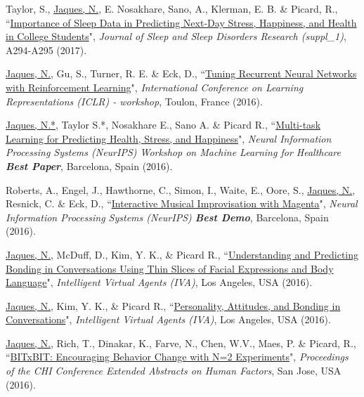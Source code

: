 \documentclass[paper=letter,fontsize=11pt]{scrartcl} %
\newcommand{\PaperEntry}[6]{
        \noindent #1, ``\href{#6}{#2}", \textit{#3}, #4 (#5).}
\begin{document}
\begin{etaremune}
\item \PaperEntry{Taylor, S., \underline{Jaques, N.}, E. Nosakhare, Sano, A., Klerman, E. B. \& Picard, R.}{Importance of Sleep Data in Predicting Next-Day Stress, Happiness, and Health in College Students}{Journal of Sleep and Sleep Disorders Research (suppl\_1)}{A294-A295}{2017}{https://affect.media.mit.edu/pdfs/17.Taylor-etal-MoodPrediction-SLEEP2017-Poster.pdf}

\item \PaperEntry{\underline{Jaques, N.}, Gu, S., Turner, R. E. \& Eck, D.}{Tuning Recurrent Neural Networks with Reinforcement Learning}{International Conference on Learning Representations (ICLR) - workshop}{Toulon, France}{2016}{https://openreview.net/pdf?id=Syyv2e-Kx}

\item \PaperEntry{\underline{Jaques, N.*}, Taylor S.*, Nosakhare E., Sano A. \& Picard R.}{Multi-task Learning for Predicting Health, Stress, and Happiness}{Neural Information Processing Systems (NeurIPS) Workshop on Machine Learning for Healthcare \textbf{Best Paper}}{Barcelona, Spain}{2016}{https://pdfs.semanticscholar.org/b228/7a406985980515d5cc63e9b37fb17c5186f8.pdf}

\item \PaperEntry{Roberts, A., Engel, J., Hawthorne, C., Simon, I., Waite, E., Oore, S., \underline{Jaques, N.}, Resnick, C. \& Eck, D.}{Interactive Musical Improvisation with Magenta}{Neural Information Processing Systems (NeurIPS) \textbf{Best Demo}}{Barcelona, Spain}{2016}{https://nips.cc/Conferences/2016/Schedule?showEvent=6307}

\item \PaperEntry{\underline{Jaques, N.}, McDuff, D., Kim, Y. K., \& Picard R.}{Understanding and Predicting Bonding in Conversations Using Thin Slices of Facial Expressions and Body Language}{Intelligent Virtual Agents (IVA)}{Los Angeles, USA}{2016}{http://affect.media.mit.edu/pdfs/16.Jaques-IVAbonding.pdf}

\item \PaperEntry{\underline{Jaques, N.}, Kim, Y. K., \& Picard R.}{Personality, Attitudes, and Bonding in Conversations}{Intelligent Virtual Agents (IVA)}{Los Angeles, USA}{2016}{http://affect.media.mit.edu/pdfs/16.Jaques-IVApersonality.pdf}

\item \PaperEntry{\underline{Jaques, N.}, Rich, T., Dinakar, K., Farve, N., Chen, W.V., Maes, P. \& Picard, R.}{BITxBIT: Encouraging Behavior Change with N=2 Experiments}{Proceedings of the CHI Conference Extended Abstracts on Human Factors}{San Jose, USA}{2016}{http://affect.media.mit.edu/pdfs/16.Jaques-etal-CHI.pdf}


\end{etaremune}
\end{document}
